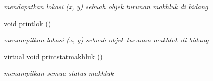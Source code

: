 \begin{DoxyCompactItemize}
\begin{DoxyCompactList}\small\item\em mendapatkan lokasi (x, y) sebuah objek turunan makhluk di bidang \end{DoxyCompactList}\item 
void \hyperlink{classmakhluk_a8dd010db343f225fe4dc01b36761c888}{printlok} ()\hypertarget{classmakhluk_a8dd010db343f225fe4dc01b36761c888}{}\label{classmakhluk_a8dd010db343f225fe4dc01b36761c888}

\begin{DoxyCompactList}\small\item\em menampilkan lokasi (x, y) sebuah objek turunan makhluk di bidang \end{DoxyCompactList}\item 
virtual void \hyperlink{classmakhluk_a87083e725642bb622827304d146242d2}{printstatmakhluk} ()\hypertarget{classmakhluk_a87083e725642bb622827304d146242d2}{}\label{classmakhluk_a87083e725642bb622827304d146242d2}

\begin{DoxyCompactList}\small\item\em menampilkan semua status makhluk \end{DoxyCompactList}\end{DoxyCompactItemize}
